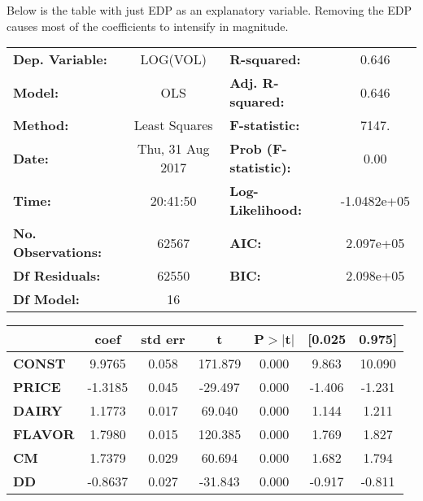 \documentclass{article}
\begin{document}
Below is the table with just EDP as an explanatory variable. Removing the EDP causes most of the coefficients to intensify in magnitude.

\begin{center}
\begin{tabular}{lclc}
\toprule
\textbf{Dep. Variable:}    &        LOG(VOL)         & \textbf{  R-squared:         } &      0.646   \\
\textbf{Model:}            &       OLS        & \textbf{  Adj. R-squared:    } &      0.646   \\
\textbf{Method:}           &  Least Squares   & \textbf{  F-statistic:       } &      7147.   \\
\textbf{Date:}             & Thu, 31 Aug 2017 & \textbf{  Prob (F-statistic):} &      0.00    \\
\textbf{Time:}             &     20:41:50     & \textbf{  Log-Likelihood:    } & -1.0482e+05  \\
\textbf{No. Observations:} &       62567      & \textbf{  AIC:               } &  2.097e+05   \\
\textbf{Df Residuals:}     &       62550      & \textbf{  BIC:               } &  2.098e+05   \\
\textbf{Df Model:}         &          16      & \textbf{                     } &              \\
\bottomrule
\end{tabular}
\begin{tabular}{lcccccc}
               & \textbf{coef} & \textbf{std err} & \textbf{t} & \textbf{P$>$$|$t$|$} & \textbf{[0.025} & \textbf{0.975]}  \\
\midrule
\textbf{CONST} &       9.9765  &        0.058     &   171.879  &         0.000        &        9.863    &       10.090     \\
\textbf{PRICE}    &      -1.3185  &        0.045     &   -29.497  &         0.000        &       -1.406    &       -1.231     \\
\textbf{DAIRY}    &       1.1773  &        0.017     &    69.040  &         0.000        &        1.144    &        1.211     \\
\textbf{FLAVOR}    &       1.7980  &        0.015     &   120.385  &         0.000        &        1.769    &        1.827     \\
\textbf{CM}    &       1.7379  &        0.029     &    60.694  &         0.000        &        1.682    &        1.794     \\
\textbf{DD}    &      -0.8637  &        0.027     &   -31.843  &         0.000        &       -0.917    &       -0.811     \\

\end{tabular}
\end{center}
\end{document}
